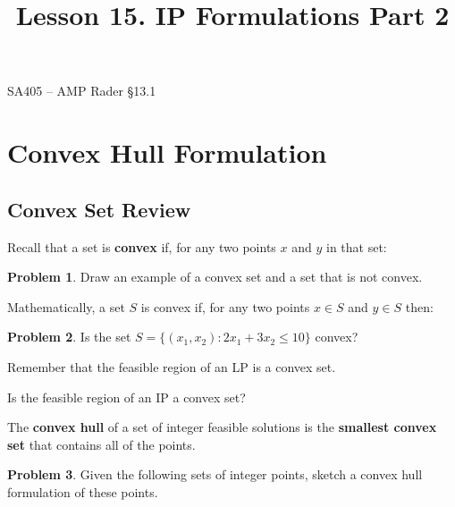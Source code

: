 \documentclass[11pt]{article}
\makeatletter
\theoremstyle{definition}
\newtheorem{problem}{Problem}
\renewcommand{\maketitle}{
  \noindent SA405 -- AMP \hfill Rader \S 13.1  \\

  \begin{center}\Large{\textbf{\@title}}\end{center}
}
\makeatother
\begin{document}
  
\title{Lesson 15.  IP Formulations Part 2}

\maketitle


\section{Convex Hull Formulation}

\subsection{Convex Set Review}

Recall that a set is \textbf{convex} if, for any two points $x$ and $y$ in that set: \vspace{0.5in}

\begin{problem}
Draw an example of a convex set and a set that is not convex.
\end{problem}

\vspace{1.5in}


Mathematically, a set $S$ is convex if, for any two points $x \in S$ and $y \in S$ then: \vspace{0.5in}

\begin{problem}
Is the set $S = \{(x_1, x_2): 2 x_1 + 3 x_2 \leq 10\}$ convex?
\end{problem}

\vspace{1.5in}

\begin{tcolorbox}
Remember that the feasible region of an LP is a convex set.
\end{tcolorbox}

Is the feasible region of an IP a convex set?

\newpage

\begin{tcolorbox}
The \textbf{convex hull} of a set of integer feasible solutions is the \textbf{smallest convex set} that contains all of the points. 
\end{tcolorbox}


\begin{problem}
Given the following sets of integer points, sketch a convex hull formulation of these points.
\end{problem}
\end{document}
